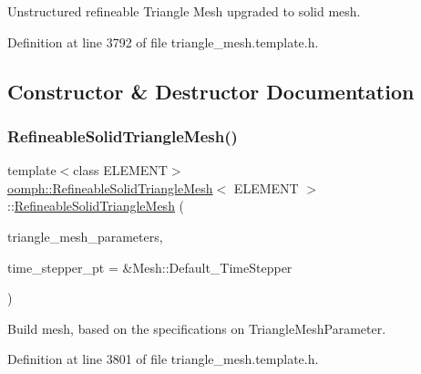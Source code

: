Unstructured refineable Triangle Mesh upgraded to solid mesh. 

Definition at line 3792 of file triangle\+\_\+mesh.\+template.\+h.



\subsection{Constructor \& Destructor Documentation}
\mbox{\label{classoomph_1_1RefineableSolidTriangleMesh_a813f756c2576d7ef129a603f4ac441ba}} 
\subsubsection{\texorpdfstring{Refineable\+Solid\+Triangle\+Mesh()}{RefineableSolidTriangleMesh()}\hspace{0.1cm}{\footnotesize\ttfamily [1/2]}}
{\footnotesize\ttfamily template$<$class E\+L\+E\+M\+E\+NT$>$ \\
\hyperlink{classoomph_1_1RefineableSolidTriangleMesh}{oomph\+::\+Refineable\+Solid\+Triangle\+Mesh}$<$ E\+L\+E\+M\+E\+NT $>$\+::\hyperlink{classoomph_1_1RefineableSolidTriangleMesh}{Refineable\+Solid\+Triangle\+Mesh} (\begin{DoxyParamCaption}\item[{\hyperlink{classoomph_1_1TriangleMeshParameters}{Triangle\+Mesh\+Parameters} \&}]{triangle\+\_\+mesh\+\_\+parameters,  }\item[{Time\+Stepper $\ast$}]{time\+\_\+stepper\+\_\+pt = {\ttfamily \&Mesh\+:\+:Default\+\_\+TimeStepper} }\end{DoxyParamCaption})\hspace{0.3cm}{\ttfamily [inline]}}



Build mesh, based on the specifications on Triangle\+Mesh\+Parameter. 



Definition at line 3801 of file triangle\+\_\+mesh.\+template.\+h.

\mbox{\label{classoomph_1_1RefineableSolidTriangleMesh_ab5924620ada32f8f95be71fd0bc6a110}} 
